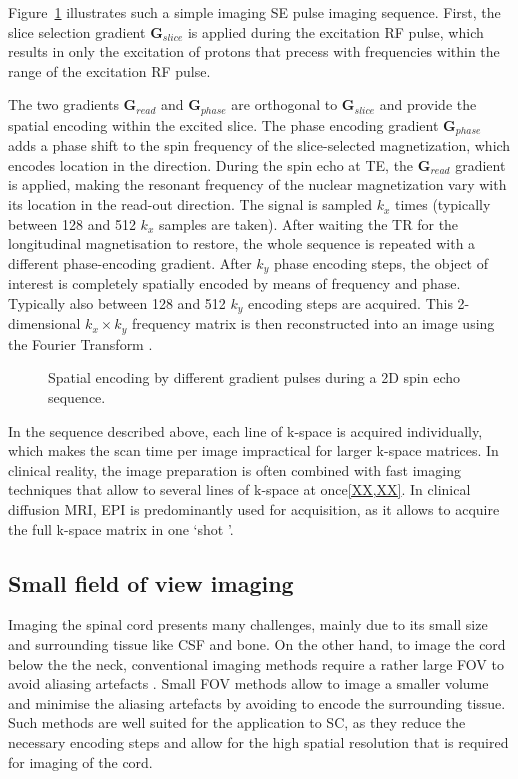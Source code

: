 Figure~\ref{fig:chapter2 SE imaging sequence} illustrates such a simple imaging SE pulse imaging sequence. First, the slice selection gradient $\textbf{G}_{slice}$ is applied during the excitation RF pulse, which results in only the excitation of protons that precess with frequencies within the range of the excitation RF pulse. 

The two gradients $\textbf{G}_{read}$ and $\textbf{G}_{phase}$ are orthogonal to $\textbf{G}_{slice}$ and provide the spatial encoding within the excited slice. The phase encoding gradient $\textbf{G}_{phase}$ adds a phase shift to the spin frequency of the slice-selected magnetization, which encodes location in the  direction. During the spin echo at TE, the $\textbf{G}_{read}$ gradient is applied, making the resonant frequency of the nuclear magnetization vary with its location in the read-out direction. The signal is sampled $k_x$ times (typically between 128 and 512 $k_x$ samples are taken).
After waiting the \gls{TR} for the longitudinal magnetisation to restore, the whole sequence is repeated with a different phase-encoding gradient. After $k_y$ phase encoding steps, the object of interest is completely spatially encoded by means of frequency and phase. Typically also between 128 and 512 $k_y$ encoding steps are acquired. This 2-dimensional $k_x\times k_y$ frequency matrix is then reconstructed into an image using the Fourier Transform \citep{Ljunggren:1983,Twieg:1983}.
\begin{figure}[ht]
\centering
{}
\caption{Spatial encoding by different gradient pulses during a 2D spin echo sequence.}
\label{fig:chapter2 SE imaging sequence}
\end{figure}

In the sequence described above, each line of k-space is acquired individually, which makes the scan time per image impractical for larger k-space matrices. In clinical reality, the image preparation is often combined with fast imaging techniques that allow to several lines of k-space at once\ref{XX,XX}. In clinical diffusion MRI, \gls{EPI} is predominantly used for acquisition, as it allows to acquire the full k-space matrix in one \lq shot \rq. 

\subsection{Small field of view imaging}
Imaging the spinal cord presents many challenges, mainly due to its small size and surrounding tissue like \gls{CSF} and bone. On the other hand, to image the cord below the the neck, conventional imaging methods require a rather large \gls{FOV} to avoid aliasing artefacts \citep{Bernstein:2004,McRobbie:2002}. Small \gls{FOV} methods allow to image a smaller volume and minimise the aliasing artefacts by avoiding to encode the surrounding tissue\citep{Feinberg:1985}. Such methods are well suited for the application to \gls{SC}, as they reduce the necessary encoding steps and allow for the high spatial resolution that is required for imaging of the cord.  


